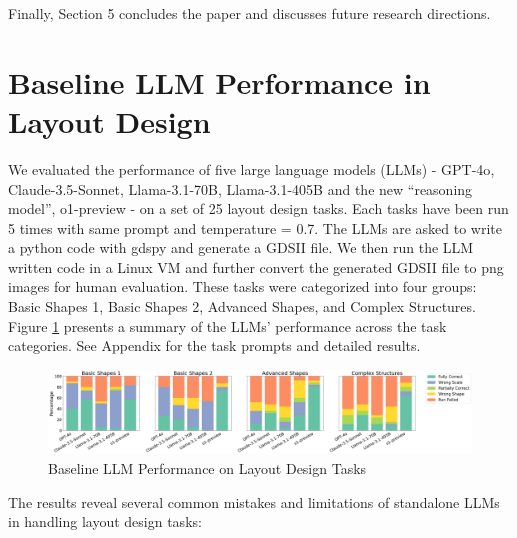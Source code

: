 \documentclass{article}
\begin{document}
Finally, Section 5 concludes the paper and discusses future research directions.

\section{Baseline LLM Performance in Layout Design}

We evaluated the performance of five large language models (LLMs) - GPT-4o\cite{GPT-4o}, Claude-3.5-Sonnet\cite{Claude-3.5-Sonnet}, Llama-3.1-70B\cite{Llama-3.1-70B}, Llama-3.1-405B\cite{Llama-3.1-405B} and the new ``reasoning model'', o1-preview\cite{o1-preview} - on a set of 25 layout design tasks. Each tasks have been run 5 times with same prompt and temperature = 0.7. The LLMs are asked to write a python code with gdspy\cite{gdspy} and generate a GDSII file. We then run the LLM written code in a Linux VM and further convert the generated GDSII file to png images for human evaluation. These tasks were categorized into four groups: Basic Shapes 1, Basic Shapes 2, Advanced Shapes, and Complex Structures. Figure \ref{fig:baseline-llm-performance} presents a summary of the LLMs' performance across the task categories. See Appendix for the task prompts and detailed results.

\begin{figure}[h]
  \centering
  \includegraphics[width=\textwidth]{baseline-llm-performance.png}
  \caption{Baseline LLM Performance on Layout Design Tasks}
  \label{fig:baseline-llm-performance}
\end{figure}

The results reveal several common mistakes and limitations of standalone LLMs in handling layout design tasks:
\end{document}
